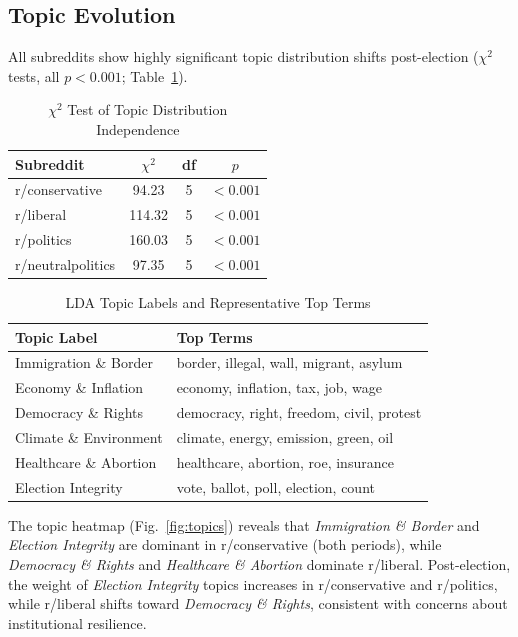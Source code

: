 \documentclass[journal]{IEEEtran}
\begin{document}
\subsection{Topic Evolution}

All subreddits show highly significant topic distribution shifts
post-election ($\chi^2$ tests, all $p < 0.001$; Table~\ref{tab:chi2}).

\begin{table}[h]
\centering
\caption{$\chi^2$ Test of Topic Distribution Independence}
\label{tab:chi2}
\begin{tabular}{lccc}
\toprule
Subreddit & $\chi^2$ & df & $p$ \\
\midrule
r/conservative    & 94.23  & 5 & $<0.001$ \\
r/liberal         & 114.32 & 5 & $<0.001$ \\
r/politics        & 160.03 & 5 & $<0.001$ \\
r/neutralpolitics & 97.35  & 5 & $<0.001$ \\
\bottomrule
\end{tabular}
\end{table}

\begin{table}[h]
\centering
\caption{LDA Topic Labels and Representative Top Terms}
\label{tab:topics}
\begin{tabular}{ll}
\toprule
Topic Label & Top Terms \\
\midrule
Immigration \& Border   & border, illegal, wall, migrant, asylum \\
Economy \& Inflation    & economy, inflation, tax, job, wage \\
Democracy \& Rights     & democracy, right, freedom, civil, protest \\
Climate \& Environment  & climate, energy, emission, green, oil \\
Healthcare \& Abortion  & healthcare, abortion, roe, insurance \\
Election Integrity      & vote, ballot, poll, election, count \\
\bottomrule
\end{tabular}
\end{table}

The topic heatmap (Fig.~\ref{fig:topics}) reveals that
\textit{Immigration \& Border} and \textit{Election Integrity} are
dominant in r/conservative (both periods), while
\textit{Democracy \& Rights} and \textit{Healthcare \& Abortion}
dominate r/liberal. Post-election, the weight of \textit{Election
Integrity} topics increases in r/conservative and r/politics, while
r/liberal shifts toward \textit{Democracy \& Rights}, consistent with
concerns about institutional resilience.
\end{document}
